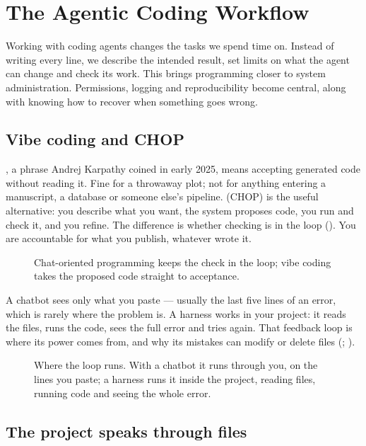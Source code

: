 \chapter{The Agentic Coding Workflow}
\label{ch:agentic}

Working with coding agents changes the tasks we spend time on. Instead of
writing every line, we describe the intended result, set limits on what the
agent can change and check its work. This brings programming closer to system
administration. Permissions, logging and reproducibility become central, along
with knowing how to recover when something goes wrong.

\section{Vibe coding and CHOP}

, a phrase Andrej Karpathy coined in early 2025, means
accepting generated code without reading it. Fine for a throwaway plot; not
for anything entering a manuscript, a database or someone else's pipeline.
 (CHOP) is the useful alternative: you
describe what you want, the system proposes code, you run and check it, and
you refine. The difference is whether checking is in the loop
(). You
are accountable for what you publish, whatever wrote it.

\begin{figure}[htbp]
\centering
{}
\caption{Chat-oriented programming keeps the check in the loop; vibe coding
takes the proposed code straight to acceptance.}
\label{fig:chop}
\end{figure}

A chatbot sees only what you paste --- usually the last five lines of an error,
which is rarely where the problem is. A harness works in your project: it reads
the files, runs the code, sees the full error and tries again. That feedback
loop is where its power comes from, and why its mistakes can modify or delete
files (; ).

\begin{figure}[htbp]
\centering
{}
\caption{Where the loop runs. With a chatbot it runs through you, on the lines
you paste; a harness runs it inside the project, reading files, running code
and seeing the whole error.}
\label{fig:harnessloop}
\end{figure}

\section{The project speaks through files}

